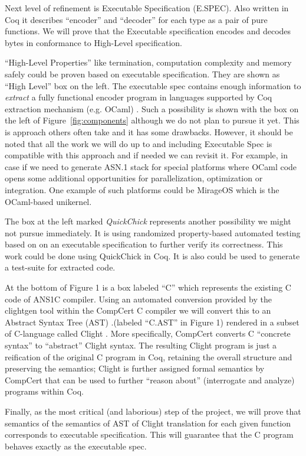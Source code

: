 \documentclass[acmsmall,nonacm]{acmart}
\begin{document}
Next level of refinement is Executable Specification (E.SPEC). Also
written in Coq it describes ``encoder'' and ``decoder'' for each type
as a pair of pure functions. We will prove that the Executable
specification encodes and decodes bytes in conformance to High-Level
specification.

``High-Level Properties'' like termination, computation complexity and
memory safely could be proven based on executable specification. They
are shown as ``High Level'' box on the left. The executable spec
contains enough information to \textit{extract} a fully functional
encoder program in languages supported by Coq extraction mechanism
(e.g. OCaml) \cite{Extraction}. Such a possibility is shown with the box
on the left of Figure~\ref{fig:components} although we do not plan to
pursue it yet. This is approach others often take and it has some
drawbacks. However, it should be noted that all the work we will do up
to and including Executable Spec is compatible with this approach and
if needed we can revisit it. For example, in case if we need to
generate ASN.1 stack for special platforms where OCaml code opens some
additional opportunities for parallelization, optimization or
integration. One example of such platforms could be MirageOS
\cite{MirageOS} which is the OCaml-based unikernel.

The box at the left marked \textit{QuickChick} represents another
possibility we might not pursue immediately. It is using randomized
property-based automated testing based on on an executable
specification to further verify its correctness. This work could be
done using QuickChick \cite{QuickChick} in Coq. It is also could be used
to generate a test-suite for extracted code.

At the bottom of Figure 1 is a box labeled ``C'' which represents the
existing C code of ANS1C compiler. Using an automated conversion
provided by the clightgen tool within the CompCert C compiler
\cite{CompCert} we will convert this to an Abstract Syntax Tree (AST)
\cite{AST} .(labeled ``C.AST'' in Figure 1) rendered in a subset
of C-language called Clight \cite{Mechanized}. More specifically,
CompCert converts C ``concrete syntax'' to ``abstract'' Clight
syntax. The resulting Clight program is just a reification of the
original C program in Coq, retaining the overall structure and
preserving the semantics; Clight is further assigned formal semantics
by CompCert that can be used to further ``reason about'' (interrogate
and analyze) programs within Coq.

Finally, as the most critical (and laborious) step of the project, we
will prove that semantics of the semantics of AST of Clight
translation for each given function corresponds to executable
specification. This will guarantee that the C program behaves exactly
as the executable spec.
\end{document}

